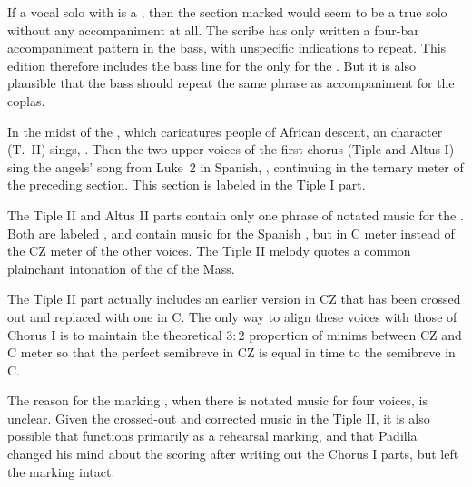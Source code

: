 If a vocal solo with  is a , then the section marked 
 would seem to be a true solo without any accompaniment 
at all.
The scribe has only written a four-bar accompaniment pattern in the bass, with 
unspecific indications to repeat.
This edition therefore includes the bass line for the  only 
for the .
But it is also plausible that the bass should repeat the same phrase as 
accompaniment for the coplas.


In the midst of the , which caricatures people of African
descent, an  character (T.~II) sings, .
Then the two upper voices of the first chorus (Tiple and Altus I) sing the 
angels' song from Luke~2 in Spanish, , continuing in the ternary meter of the preceding section.
This section is labeled  in the Tiple I part.

The Tiple II and Altus II parts contain only one phrase of notated music for 
the .
Both are labeled , and contain music for the 
Spanish , but in C meter instead of the CZ meter of the other 
voices.
The Tiple II melody quotes a common plainchant intonation of 
the  of the Mass.

The Tiple II part actually includes an earlier version in CZ that has been 
crossed out and replaced with one in C.
The only way to align these voices with those of Chorus I is to maintain the 
theoretical $3:2$ proportion of minims between CZ and C meter so that the 
perfect semibreve in CZ is equal in time to the semibreve in C.

The reason for the marking , when there is notated music for four 
voices, is unclear.
Given the crossed-out and corrected music in the Tiple II, it is also possible 
that  functions primarily as a rehearsal marking, and that Padilla 
changed his mind about the scoring after writing out the Chorus I parts, but 
left the marking intact.

